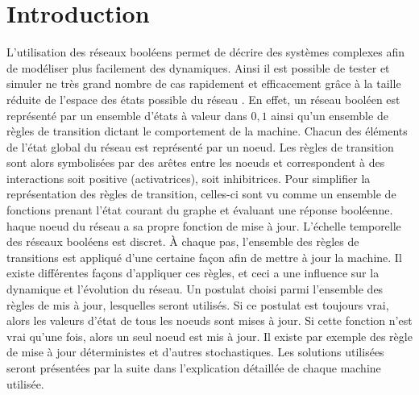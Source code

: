 \documentclass[11pt, a4paper]{article}
\begin{document}
\section{Introduction}
L'utilisation des réseaux booléens permet de décrire des systèmes complexes
afin de modéliser plus facilement des dynamiques. Ainsi il est possible de
tester et simuler ne très grand nombre de cas rapidement et efficacement grâce
à la taille réduite de l'espace des états possible du réseau \cite{greil2012}.
En effet, un réseau booléen est représenté par un ensemble d'états à valeur
dans $ {0, 1} $ ainsi qu'un ensemble de règles de transition dictant le
comportement de la machine. Chacun des éléments de l'état global du réseau est
représenté par un noeud. Les règles de transition sont alors symbolisées par
des arêtes entre les noeuds et correspondent à des interactions soit positive
(activatrices), soit inhibitrices. Pour simplifier la représentation des règles
de transition, celles-ci sont vu comme un ensemble de fonctions prenant l'état
courant du graphe et évaluant une réponse booléenne. haque noeud du réseau a sa
propre fonction de mise à jour. L'échelle temporelle des réseaux booléens est
discret. À chaque pas, l'ensemble des règles de transitions est appliqué d'une
certaine façon afin de mettre à jour la machine. Il existe différentes façons
d'appliquer ces règles, et ceci a une influence sur la dynamique et l'évolution
du réseau. Un postulat choisi parmi l'ensemble des règles de mis à jour,
lesquelles seront utilisés. Si ce postulat est toujours vrai, alors les valeurs
d'état de tous les noeuds sont mises à jour. Si cette fonction n'est vrai
qu'une fois, alors un seul noeud est mis à jour. Il existe par exemple des
règle de mise à jour déterministes et d'autres stochastiques. Les solutions
utilisées seront présentées par la suite dans l'explication détaillée de chaque
machine utilisée. \\
\end{document}
